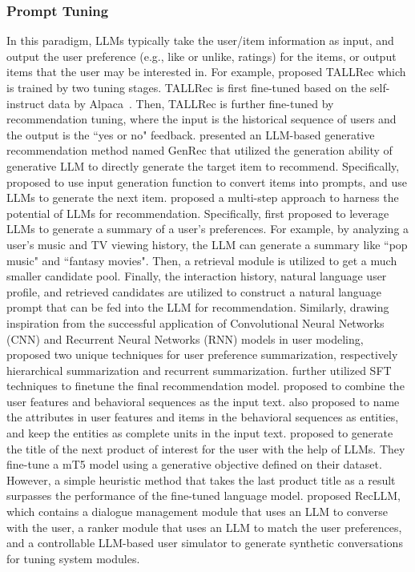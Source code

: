 \documentclass[sn-mathphys-num]{sn-jnl}%
\theoremstyle{thmstyleone}%
\theoremstyle{thmstyletwo}%
\theoremstyle{thmstylethree}%
\begin{document}
\subsubsection{Prompt Tuning}
In this paradigm, LLMs typically take the user/item information as input, and output the user preference (e.g., like or unlike, ratings) for the items, or output items that the user may be interested in. For example, \cite{DBLP:journals/corr/abs-2305-00447} proposed TALLRec which is trained by two tuning stages. TALLRec is first fine-tuned based on the self-instruct data by Alpaca~\cite{alpaca}. Then, TALLRec is further fine-tuned by recommendation tuning, where the input is the historical sequence of users and the output is the ``yes or no" feedback. 
\cite{ji2023genrec} presented an LLM-based generative recommendation method named GenRec that utilized the generation ability of generative LLM to directly generate the target item to recommend. Specifically, \cite{ji2023genrec} proposed to use input generation function to convert items into prompts, and use LLMs to generate the next item. 
\cite{chen2023palr} proposed a multi-step
approach to harness the potential of LLMs for recommendation. Specifically, \cite{chen2023palr} first proposed to leverage LLMs to generate a summary of a user’s preferences. For example, by analyzing a user’s music and TV viewing history, the LLM can generate a summary like ``pop music" and ``fantasy movies". Then, a retrieval module is utilized to get a much smaller candidate pool. Finally, the interaction history, natural language user profile, and retrieved candidates are utilized to construct a natural language prompt that can be fed into the LLM for recommendation. 
Similarly, drawing inspiration from the successful application of Convolutional Neural Networks (CNN) and Recurrent Neural Networks (RNN) models in user modeling, \cite{zheng2024harnessing} proposed two unique techniques for user preference summarization, respectively hierarchical summarization and recurrent summarization. \cite{zheng2024harnessing} further utilized SFT techniques to finetune the final recommendation model. \cite{chu2023leveraging} proposed to combine the user features and behavioral sequences as the input text. \cite{chu2023leveraging} also proposed to name the attributes in user features and items in the behavioral sequences as entities, and keep the entities as complete units in the input text. \cite{jin2023amazon} proposed to generate the title of the next product of interest for the user with the help of LLMs. They fine-tune a mT5 model using a generative objective defined on their dataset. However, a simple heuristic method that takes the last product title as a result surpasses the performance of the fine-tuned language model. 
\cite{friedman2023leveraging} proposed RecLLM, which contains a dialogue management module that uses an LLM to converse with the user, a ranker module that uses an LLM to match the user preferences, and a controllable LLM-based user simulator to generate synthetic conversations for tuning system modules. 
\end{document}
